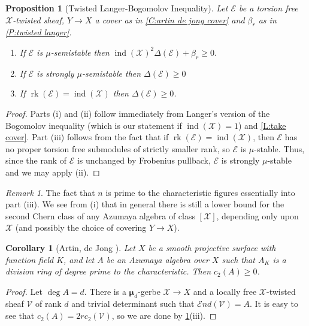 \documentclass[11pt]{amsart}
\newcommand{\ms}[1]{\mathscr #1}
\newcommand{\send}{\ms E\!nd}
\newcommand{\m}{\boldsymbol{\mu}}
\DeclareMathOperator{\ind}{ind}
\renewcommand{\[}{[\!\hspace{0.03em}[}
\renewcommand{\]}{]\!\hspace{0.03em}]}
\renewcommand{\(}{(\!\hspace{0.03em}(}
\renewcommand{\)}{)\!\hspace{0.03em})}
\DeclareMathOperator{\rk}{\operatorname{rk}}
\newtheorem{prop}[lem]{Proposition}
\newtheorem{cor}[lem]{Corollary}
\theoremstyle{definition}
\theoremstyle{remark}
\newtheorem{remark}[lem]{Remark}
\newenvironment{rem}{\begin{remark}}{\nolinebreak{\hfill $\blacklozenge$} \end{remark}}
\begin{document}
\begin{prop}[Twisted Langer-Bogomolov Inequality]\label{P:langer bogomolov} Let $\ms E$ be a torsion 
free $\ms X$-twisted sheaf, $Y\to X$ a cover as in \ref{C:artin de 
jong cover} and $\beta_{r}$ as in \ref{P:twisted langer}.
\begin{enumerate}
    \item[(i)] If $\ms E$ is $\mu$-semistable then $\ind(\ms 
    X)^{2}\Delta(\ms E)+\beta_{r}\geq 0.$

    \item[(ii)] If $\ms E$ is strongly $\mu$-semistable then 
    $\Delta(\ms E)\geq 0$
    
    \item[(iii)] If $\rk(\ms E)=\ind(\ms X)$ then $\Delta(\ms E)\geq 0$.
\end{enumerate}
\end{prop}
\begin{proof} Parts (i) and (ii) follow immediately from Langer's 
version of the Bogomolov inequality \cite[3.2]{langer} (which is our statement if 
$\ind(\ms X)=1$) and \ref{L:take cover}.  Part (iii) follows from the 
fact that if $\rk(\ms E)=\ind(\ms X)$, then $\ms E$ has no proper 
torsion free submodules of strictly smaller rank, so $\ms E$ is 
$\mu$-stable.  Thus, since the 
rank of $\ms E$ is unchanged by Frobenius pullback, $\ms E$ is 
strongly $\mu$-stable and we may apply (ii).
\end{proof}
\begin{rem} The fact that $n$ is prime to the characteristic figures 
essentially into part (iii).  We see from (i) that in general there 
is still a lower bound for the second Chern class of any Azumaya 
algebra of class $[\ms X]$, depending only upon $\ms X$ (and 
possibly the choice of covering $Y\to X$).
\end{rem}

\begin{cor}[Artin, de Jong {\cite[7.2.1]{artin-dejong}}]\label{C:artin de jong c2} Let $X$ be a smooth projective surface 
with function field $K$, and let $A$ be an Azumaya algebra over $X$ 
such that $A_{K}$ is a division ring of degree prime to the 
characteristic.  Then $c_{2}(A)\geq 0$.
\end{cor}
\begin{proof} Let $\deg A=d$.  There is a $\m_{d}$-gerbe $\ms X\to X$ and a 
locally free $\ms X$-twisted sheaf $\ms V$ of rank $d$ and trivial 
determinant such that $\send(\ms V)=A$.  It is easy to see that 
$c_{2}(A)=2rc_{2}(\ms V)$, so we are done by \ref{P:langer bogomolov}(iii).
\end{proof}
\end{document}
